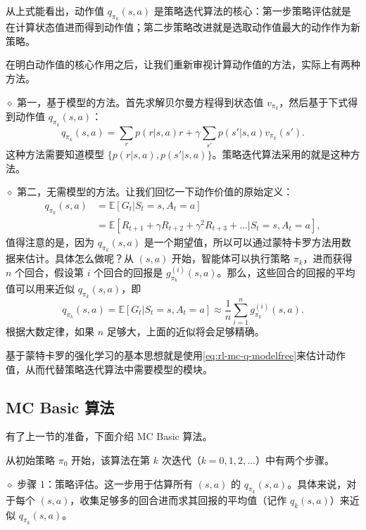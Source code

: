 从上式能看出，动作值 $q_{\pi_k}(s,a)$ 是策略迭代算法的核心：第一步策略评估就是在计算状态值进而得到动作值；第二步策略改进就是选取动作值最大的动作作为新策略。

在明白动作值的核心作用之后，让我们重新审视计算动作值的方法，实际上有两种方法。

$\diamond$ 第一，基于模型的方法。首先求解贝尔曼方程得到状态值 $v_{\pi_{k}}$，然后基于下式得到动作值 $q_{\pi_{k}}(s, a)$：
\begin{equation}
\label{eq:rl-mc-q-model}
q_{\pi_{k}}(s, a) = \sum_{r} p(r|s,a) r + \gamma \sum_{s'} p(s'|s,a) v_{\pi_{k}}(s').
\end{equation}
这种方法需要知道模型 $\{p(r|s,a), p(s'|s,a)\}$。策略迭代算法采用的就是这种方法。

$\diamond$ 第二，无需模型的方法。让我们回忆一下动作价值的原始定义：
\begin{equation}
\begin{aligned}
q_{\pi_{k}}(s, a) &= \mathbb{E}[G_{t} | S_{t} = s, A_{t} = a] \\
&= \mathbb{E}[R_{t+1} + \gamma R_{t+2} + \gamma^{2} R_{t+3} + \dots | S_{t} = s, A_{t} = a],
\end{aligned}
\end{equation}
值得注意的是，因为 $q_{\pi_k}(s,a)$ 是一个期望值，所以可以通过蒙特卡罗方法用数据来估计。具体怎么做呢？从 $(s,a)$ 开始，智能体可以执行策略 $\pi_k$，进而获得 $n$ 个回合，假设第 $i$ 个回合的回报是 $g_{\pi_k}^{(i)}(s,a)$。那么，这些回合的回报的平均值可以用来近似 $q_{\pi_k}(s,a)$，即
\begin{equation}
\label{eq:rl-mc-q-modelfree}
q_{\pi_{k}}(s, a) = \mathbb{E}[G_{t} | S_{t} = s, A_{t} = a] \approx \frac{1}{n} \sum_{i=1}^{n} g_{\pi_{k}}^{(i)}(s, a).
\end{equation}
根据大数定律，如果 $n$ 足够大，上面的近似将会足够精确。

基于蒙特卡罗的强化学习的基本思想就是使用\cref{eq:rl-mc-q-modelfree}来估计动作值，从而代替策略迭代算法中需要模型的模块。

\subsection{MC Basic 算法}
\label{sec:rl-mc-basic-algorithm}

有了上一节的准备，下面介绍 MC Basic 算法。

从初始策略 $\pi_0$ 开始，该算法在第 $k$ 次迭代（$k = 0, 1, 2, \ldots$）中有两个步骤。

$\diamond$ 步骤 1：策略评估。这一步用于估算所有 $(s,a)$ 的 $q_{\pi_k}(s,a)$。具体来说，对于每个 $(s,a)$，收集足够多的回合进而求其回报的平均值（记作 $q_{k}(s,a)$）来近似 $q_{\pi_k}(s,a)$。

